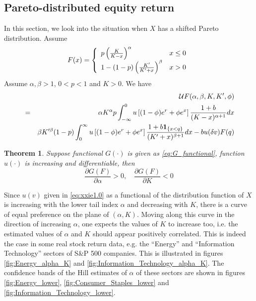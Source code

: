\documentclass{article}
\newcommand{\pd}[2]{
  \frac{\partial #1}{\partial #2}
}
\newcommand{\1}[1]{
  \mathbf{1}_{\{#1\}}
}
\newtheorem{theorem}{Theorem}
\begin{document}
\subsection{Pareto-distributed equity return}
In this section, we look into the situation when $X$ has a shifted
Pareto distribution. Assume
\begin{equation}
  \label{eq:X_distr}
  F(x) = \left\{
  \begin{array}{ll}
    p \left(
    {K \over K - x}
    \right)^\alpha & x \leq 0 \\
    1 - (1 - p) \left(
    {K' \over K' + x}
    \right)^\beta & x > 0
  \end{array}
  \right.
\end{equation}
Assume $\alpha, \beta > 1$, $0 < p < 1$ and $K > 0$.
We have
\begin{eqnarray}
  && \mathcal U F (\alpha, \beta, K, K', \phi) \nonumber \\
  &=&
  \alpha K^\alpha  p
  \int_{-\infty}^0
  u\left[ (1 - \phi) e^r + \phi e^x \right]
  {1 + b \over (K - x)^{\alpha + 1}} dx
  \nonumber \\
  &&
  \beta K'^\beta (1 - p)
  \int_{0}^\infty
  u\left[ (1 - \phi) e^r + \phi e^x \right]
  {1 + b \1{x < q} \over (K' + x)^{\beta + 1}} dx 
  - b u(\delta v) F(q)
  \label{eq:xxie1.0}
\end{eqnarray}
\begin{theorem}
  \label{thrm:I}
  Suppose functional $G(\cdot)$ is given as \eqref{eq:G_functional},
  function $u(\cdot)$ is increasing and differentiable, then
  \[
  \pd{G(F)}{\alpha} > 0,
  \quad
  \pd{G(F)}{K} < 0
  \]
\end{theorem}
Since $u(v)$ given in \eqref{eq:xxie1.0} as a
functional of the distribution function of $X$ is increasing with the
lower tail index $\alpha$ and decreasing with $K$, there is a curve of
equal preference on the plane of $(\alpha, K)$. Moving along this
curve in the direction of increasing $\alpha$, one expects the values
of $K$ to increase too, i.e. the estimated values of $\alpha$ and $K$
should appear positively correlated. This is indeed the case in some
real stock return data, e.g. the ``Energy'' and ``Information Technology''
sectors of S\&P 500 companies. This is illustrated in figures
\ref{fig:Energy_alpha_K} and \ref{fig:Information_Technology_alpha_K}.
The confidence bands of the Hill estimates of $\alpha$ of these
sectors are shown in figures \ref{fig:Energy_lower},
\ref{fig:Consumer_Staples_lower} and
\ref{fig:Information_Technology_lower}.
\end{document}

